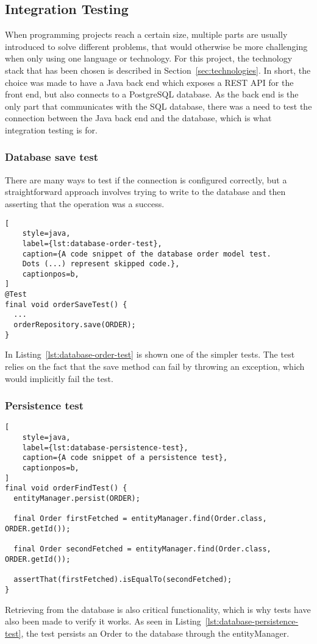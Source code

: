 \subsection{Integration Testing}\label{subsec:integration-tests}

When programming projects reach a certain size, multiple parts are usually introduced to solve different problems,
that would otherwise be more challenging when only using one language or technology.
For this project, the technology stack that has been chosen is described in Section~\ref{sec:technologies}.
In short, the choice was made to have a Java back end which exposes a REST API for the front end, but also connects to
a PostgreSQL database.
As the back end is the only part that communicates with the SQL database, there was a need to test the connection
between the Java back end and the database, which is what integration testing is for.

\subsubsection{Database save test}\label{subsubsec:database-save-integration-test}

There are many ways to test if the connection is configured correctly, but a straightforward approach involves trying
to write to the database and then asserting that the operation was a success.

\begin{lstlisting}[
    style=java,
    label={lst:database-order-test},
    caption={A code snippet of the database order model test.
    Dots (...) represent skipped code.},
    captionpos=b,
]
@Test
final void orderSaveTest() {
  ...
  orderRepository.save(ORDER);
}
\end{lstlisting}

In Listing~\ref{lst:database-order-test} is shown one of the simpler tests.
The test relies on the fact that the save method can fail by throwing an exception, which would implicitly fail the
test.

\subsubsection{Persistence test}\label{subsubsec:persistence-integration-test}

\begin{lstlisting}[
    style=java,
    label={lst:database-persistence-test},
    caption={A code snippet of a persistence test},
    captionpos=b,
]
final void orderFindTest() {
  entityManager.persist(ORDER);

  final Order firstFetched = entityManager.find(Order.class, ORDER.getId());

  final Order secondFetched = entityManager.find(Order.class, ORDER.getId());

  assertThat(firstFetched).isEqualTo(secondFetched);
}
\end{lstlisting}

Retrieving from the database is also critical functionality, which is why tests have also been made to verify it works.
As seen in Listing~\ref{lst:database-persistence-test}, the test persists an Order to the database through the
entityManager.
